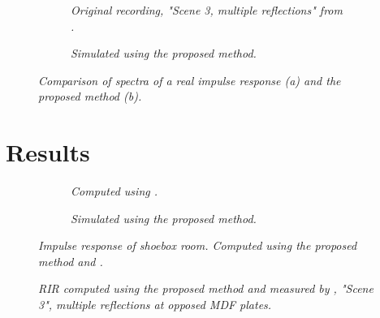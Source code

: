 \documentclass[twoside,a4paper]{article}
\begin{document}
\begin{figure}[ht]
    \center
    \begin{subfigure}[t]{0.45\textwidth}
      \centering
      
      \caption{\label{fig:fig:multReflSpecOrig} \it Original recording, "Scene 3, multiple reflections" from \cite{brinkmann_round_2019}. }
    \end{subfigure}%
    \begin{subfigure}[t]{0.45\textwidth}
      \centering
      
      \vspace{-0.37cm} %
      \caption{\label{fig:multReflSpecSim} \it Simulated using the proposed method. }
    \end{subfigure}
    \caption{\it Comparison of spectra of a real impulse response (a) and the proposed method (b).}
    \label{fig:multReflSpecCompare}
\end{figure}


\section{Results}

\begin{figure}[ht]
    \center
    \begin{subfigure}[t]{0.45\textwidth}
      \centering
      
    \caption{\label{fig:shoeA} \it Computed using \cite{lehmann_fast_2020}. }
    \end{subfigure}%
    \begin{subfigure}[t]{0.45\textwidth}
      \centering
      
            \vspace{-0.37cm} %
      \caption{\label{fig:shoeB} \it Simulated using the proposed method. }
    \end{subfigure}
    \caption{\it Impulse response of shoebox room. Computed using the proposed method and \cite{lehmann_fast_2020}.}
    \label{fig:showSpecs}
\end{figure}


\begin{figure}

    \begin{center}
      
    \end{center}
    
    \caption{\label{fig:multRefl} \it RIR computed using the proposed method and measured by \cite{brinkmann_round_2019}, "Scene 3", multiple reflections at opposed MDF plates.}
\end{figure}
\end{document}
